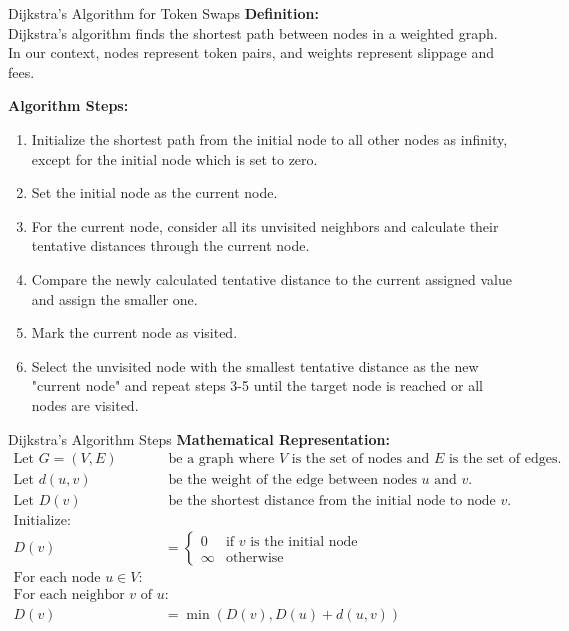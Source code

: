 \documentclass{beamer}
\begin{document}
\begin{frame}{Dijkstra's Algorithm for Token Swaps}
    \textbf{Definition:} \\
    Dijkstra's algorithm finds the shortest path between nodes in a weighted graph. In our context, nodes represent token pairs, and weights represent slippage and fees.

    \vspace{0.5cm}
    \textbf{Algorithm Steps:}
    \begin{enumerate}
        \item Initialize the shortest path from the initial node to all other nodes as infinity, except for the initial node which is set to zero.
        \item Set the initial node as the current node.
        \item For the current node, consider all its unvisited neighbors and calculate their tentative distances through the current node.
        \item Compare the newly calculated tentative distance to the current assigned value and assign the smaller one.
        \item Mark the current node as visited.
        \item Select the unvisited node with the smallest tentative distance as the new "current node" and repeat steps 3-5 until the target node is reached or all nodes are visited.
    \end{enumerate}
\end{frame}
\begin{frame}{Dijkstra's Algorithm Steps}
    \vspace{0.5cm}
    \textbf{Mathematical Representation:}
    \begin{align*}
        \text{Let } G = (V, E) & \text{ be a graph where } V \text{ is the set of nodes and } E \text{ is the set of edges.} \\
        \text{Let } d(u, v) & \text{ be the weight of the edge between nodes } u \text{ and } v. \\
        \text{Let } D(v) & \text{ be the shortest distance from the initial node to node } v. \\
        \text{Initialize:} & \\
        D(v) & = \begin{cases} 
            0 & \text{if } v \text{ is the initial node} \\
            \infty & \text{otherwise}
        \end{cases} \\
        \text{For each node } u \in V: & \\
        \text{For each neighbor } v \text{ of } u: & \\
        D(v) & = \min(D(v), D(u) + d(u, v))
    \end{align*}

    \vspace{0.5cm}
\end{frame}
\end{document}
